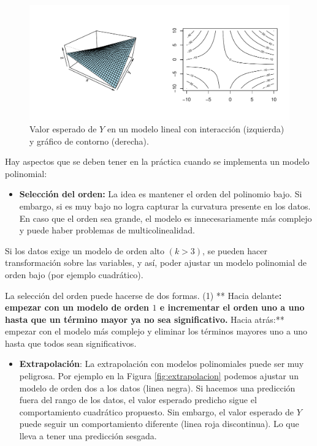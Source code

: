 \documentclass[
]{article}
\providecommand{\tightlist}{%
  \setlength{\itemsep}{0pt}\setlength{\parskip}{0pt}}
\begin{document}
\begin{figure}

{\centering \includegraphics{MLG2_files/figure-latex/modPoli3-1} 

}

\caption{Valor esperado de $Y$ en un modelo lineal con interacción (izquierda) y gráfico de contorno (derecha).}\label{fig:modPoli3}
\end{figure}

Hay aspectos que se deben tener en la práctica cuando se implementa un modelo polinomial:

\begin{itemize}
\tightlist
\item
  \textbf{Selección del orden:} La idea es mantener el orden del polinomio bajo. Si embargo, si es muy bajo no logra capturar la curvatura presente en los datos. En caso que el orden sea grande, el modelo es innecesariamente más complejo y puede haber problemas de multicolinealidad.
\end{itemize}

Si los datos exige un modelo de orden alto \((k > 3)\), se pueden hacer transformación sobre las variables, y así, poder ajustar un modelo polinomial de orden bajo (por ejemplo cuadrático).

La selección del orden puede hacerse de dos formas. (1) ** Hacia delante\textbf{: empezar con un modelo de orden \(1\) e incrementar el orden uno a uno hasta que un término mayor ya no sea significativo. }Hacia atrás:** empezar con el modelo más complejo y eliminar los términos mayores uno a uno hasta que todos sean significativos.

\begin{itemize}
\tightlist
\item
  \textbf{Extrapolación}: La extrapolación con modelos polinomiales puede ser muy peligrosa. Por ejemplo en la Figura \ref{fig:extrapolacion} podemos ajustar un modelo de orden dos a los datos (linea negra). Si hacemos una predicción fuera del rango de los datos, el valor esperado predicho sigue el comportamiento cuadrático propuesto. Sin embargo, el valor esperado de \(Y\) puede seguir un comportamiento diferente (linea roja discontinua). Lo que lleva a tener una predicción sesgada.
\end{itemize}
\end{document}
